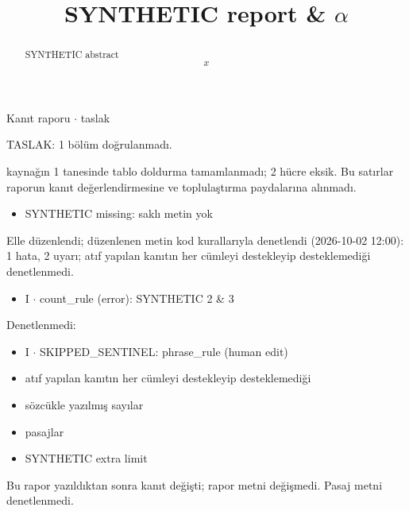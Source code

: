 \documentclass[journal]{IEEEtran}
\begin{document}
\renewcommand{\abstractname}{Özet}
\renewcommand{\IEEEkeywordsname}{Dizin Terimleri}
\renewcommand{\refname}{Kaynaklar}

\title{SYNTHETIC report \& \ensuremath{\alpha}}

\maketitle

\noindent Kanıt raporu \ensuremath{\cdot} taslak

\noindent TASLAK: 1 bölüm doğrulanmadı.

 kaynağın 1 tanesinde tablo doldurma tamamlanmadı; 2 hücre eksik. Bu satırlar raporun kanıt değerlendirmesine ve toplulaştırma paydalarına alınmadı.

\begin{itemize}
\item SYNTHETIC missing: saklı metin yok
\end{itemize}

\noindent Elle düzenlendi; düzenlenen metin kod kurallarıyla denetlendi (2026-10-02 12:00): 1 hata, 2 uyarı; atıf yapılan kanıtın her cümleyi destekleyip desteklemediği denetlenmedi.

\begin{itemize}
\item I \ensuremath{\cdot} count\_rule (error): SYNTHETIC 2 \& 3
\end{itemize}

\noindent Denetlenmedi:

\begin{itemize}
\item I \ensuremath{\cdot} SKIPPED\_SENTINEL: phrase\_rule (human edit)
\item atıf yapılan kanıtın her cümleyi destekleyip desteklemediği
\item sözcükle yazılmış sayılar
\item pasajlar
\item SYNTHETIC extra limit
\end{itemize}

\noindent Bu rapor yazıldıktan sonra kanıt değişti; rapor metni değişmedi. Pasaj metni denetlenmedi.

\begin{abstract}

SYNTHETIC abstract
\begin{equation}
\label{eq:EQ1}
x
\end{equation}
\cite{Synth26}

\end{abstract}
\end{document}
